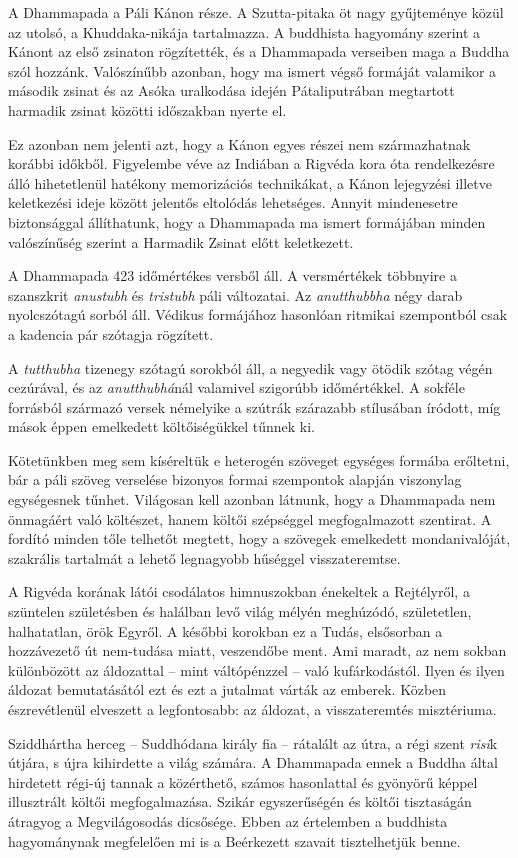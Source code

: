 
A Dhammapada a Páli Kánon része. A Szutta-pitaka öt nagy gyűjteménye közül az utolsó, a Khuddaka-nikája tartalmazza. A buddhista hagyomány szerint a Kánont az első zsinaton rögzítették, és a Dhammapada verseiben maga a Buddha szól hozzánk. Valószínűbb azonban, hogy ma ismert végső formáját valamikor a második zsinat és az Asóka uralkodása idején Pátaliputrában megtartott harmadik zsinat közötti időszakban nyerte el.

Ez azonban nem jelenti azt, hogy a Kánon egyes részei nem származhatnak korábbi időkből. Figyelembe véve az Indiában a Rigvéda kora óta rendelkezésre álló hihetetlenül hatékony memorizációs technikákat, a Kánon lejegyzési illetve keletkezési ideje között jelentős eltolódás lehetséges. Annyit mindenesetre biztonsággal állíthatunk, hogy a Dhammapada ma ismert formájában minden valószínűség szerint a Harmadik Zsinat előtt keletkezett.

A Dhammapada 423 időmértékes versből áll. A versmértékek többnyire a szanszkrit \textit{anustubh} és \textit{tristubh} páli változatai. Az \textit{anutthubbha} négy darab nyolcszótagú sorból áll. Védikus formájához hasonlóan ritmikai szempontból csak a kadencia pár szótagja rögzített.

A \textit{tutthubha} tizenegy szótagú sorokból áll, a negyedik vagy ötödik szótag végén cezúrával, és az \textit{anutthubhá}nál valamivel szigorúbb időmértékkel. A sokféle forrásból származó versek némelyike a szútrák szárazabb stílusában íródott, míg mások éppen emelkedett költőiségükkel tűnnek ki.

Kötetünkben meg sem kíséreltük e heterogén szöveget egységes formába erőltetni, bár a páli szöveg verselése bizonyos formai szempontok alapján viszonylag egységesnek tűnhet. Világosan kell azonban látnunk, hogy a Dhammapada nem önmagáért való költészet, hanem költői szépséggel megfogalmazott szentirat. A fordító minden tőle telhetőt megtett, hogy a szövegek emelkedett mondanivalóját, szakrális tartalmát a lehető legnagyobb hűséggel visszateremtse.

A Rigvéda korának látói csodálatos himnuszokban énekeltek a Rejtélyről, a szüntelen születésben és halálban levő világ mélyén meghúzódó, születetlen, halhatatlan, örök Egyről. A későbbi korokban ez a Tudás, elsősorban a hozzávezető út nem-tudása miatt, veszendőbe ment. Ami maradt, az nem sokban különbözött az áldozattal -- mint váltópénzzel -- való kufárkodástól. Ilyen és ilyen áldozat bemutatásától ezt és ezt a jutalmat várták az emberek. Közben észrevétlenül elveszett a legfontosabb: az áldozat, a visszateremtés misztériuma.

Sziddhártha herceg -- Suddhódana király fia -- rátalált az útra, a régi szent \textit{risi}k útjára, s újra kihirdette a világ számára. A Dhammapada ennek a Buddha által hirdetett régi-új tannak a közérthető, számos hasonlattal és gyönyörű képpel illusztrált költői megfogalmazása. Szikár egyszerűségén és költői tisztaságán átragyog a Megvilágosodás dicsősége. Ebben az értelemben a buddhista hagyománynak megfelelően mi is a Beérkezett szavait tisztelhetjük benne.
